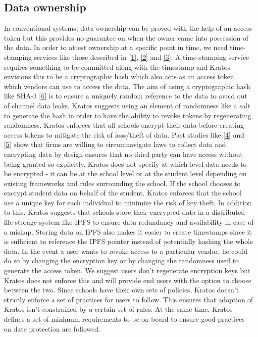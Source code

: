 \documentclass{article}
\begin{document}
\subsection{Data ownership}
In conventional systems, data ownership can be proved with the help of an access token but this provides no guarantee on when the owner came into possession of the data. In order to attest ownership at a specific point in time, we need time-stamping services like those described in \hyperref[sec:1]{[1]}, \hyperref[sec:2]{[2]} and \hyperref[sec:3]{[3]}. A time-stamping service requires something to be committed along with the timestamp and Kratos envisions this to be a cryptographic hash which also acts as an access token which vendors can use to access the data.
\bigbreak
The aim of using a cryptographic hash like SHA-3 \hyperref[sec:6]{[6]} is to ensure a uniquely random reference to the data to avoid out of channel data leaks. Kratos suggests using an element of randomness like a salt to generate the hash in order to have the ability to revoke tokens by regenerating randomness. Kratos enforces that all schools encrypt their data before creating access tokens to mitigate the risk of loss/theft of data. Past studies like \hyperref[sec:4]{[4]} and \hyperref[sec:5]{[5]} show that firms are willing to circumnavigate laws to collect data and encrypting data by design ensures that no third party can have access without being granted so explicitly.
\bigbreak
Kratos does not specify at which level data needs to be encrypted - it can be at the school level or at the student level depending on existing frameworks and rules surrounding the school. If the school chooses to encrypt student data on behalf of the student, Kratos enforces that the school use a unique key for each individual to minimize the risk of key theft. In addition to this, Kratos suggests that schools store their encrypted data in a distributed file storage system like IPFS to ensure data redundancy and availability in case of a mishap. Storing data on IPFS also makes it easier to create timestamps since it is sufficient to reference the IPFS pointer instead of potentially hashing the whole data.
\bigbreak
In the event a user wants to revoke access to a particular vendor, he could do so by changing the encryption key or by changing the randomness used to generate the access token. We suggest users don't regenerate encryption keys but Kratos does not enforce this and will provide end users with the option to choose between the two.
\bigbreak
Since schools have their own sets of policies, Kratos doesn't strictly enforce a set of practices for users to follow. This ensures that adoption of Kratos isn't constrained by a certain set of rules. At the same time, Kratos defines a set of minimum requirements to be on board to ensure good practices on date protection are followed.
\end{document}
